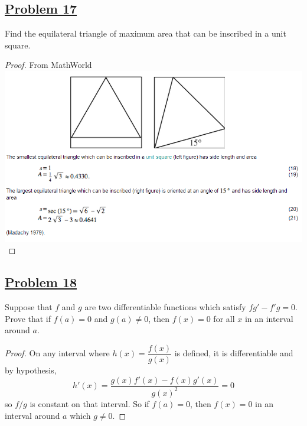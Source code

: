 \documentclass[10pt,letterpaper]{article}
\begin{document}
	
	\subsection*{{\color{purple}\underline{Problem 17}}}
	Find the equilateral triangle of maximum area that can be inscribed in a unit square.
	\begin{proof}
	From MathWorld \\
	\includegraphics[scale=0.8]{hw8.png}
	\end{proof}
	
	\subsection*{{\color{purple}\underline{Problem 18}}}
	Suppose that $f$ and $g$ are two differentiable functions which satisfy
	$fg' - f'g = 0$. Prove that if $f(a) = 0$ and $g(a) \neq 0$, then $f(x) = 0$
	for all $x$ in an interval around $a$.
\begin{proof}
	On any interval where $h(x) = \dfrac{f(x)}{g(x)}$ is defined, it is differentiable
	and by hypothesis,
	$$h'(x) = \dfrac{g(x)f'(x) - f(x)g'(x)}{g(x)^2} = 0$$ so $f/g$ is constant on 
	that interval. So if $f(a) = 0$, then $f(x) = 0$ in an interval around $a$
	which $g \neq 0$.
\end{proof}
	
\end{document}

